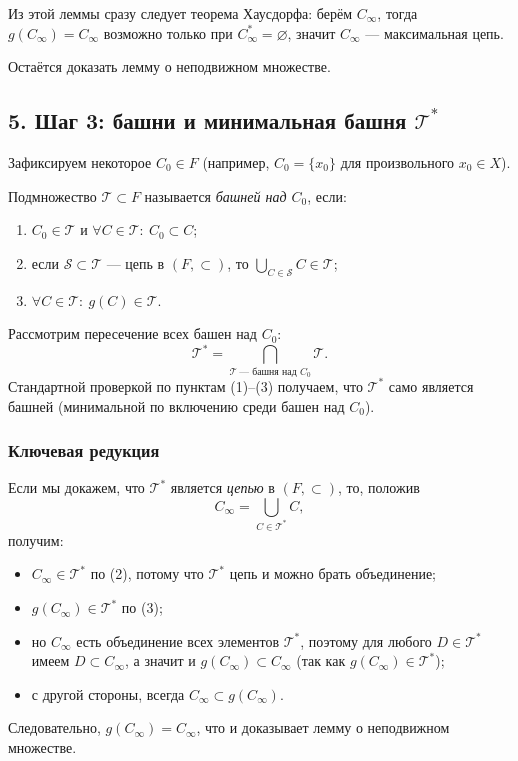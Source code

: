 \noindent
Из этой леммы сразу следует теорема Хаусдорфа: берём $C_{\infty}$, тогда $g(C_{\infty})=C_{\infty}$
возможно только при $C_{\infty}^{*}=\varnothing$, значит $C_{\infty}$ --- максимальная цепь.

Остаётся доказать лемму о неподвижном множестве.

\subsection*{5. Шаг 3: башни и минимальная башня $\mathcal T^{*}$}

Зафиксируем некоторое $C_0\in F$ (например, $C_0=\{x_0\}$ для произвольного $x_0\in X$).

\begin{definition}
    Подмножество $\mathcal T\subset F$ называется \emph{башней над $C_0$}, если:
    \begin{enumerate}
        \item $C_0\in\mathcal T$ и $\forall C\in\mathcal T:\ C_0\subset C$;
        \item если $\mathcal S\subset\mathcal T$ --- цепь в $(F,\subset)$, то $\displaystyle \bigcup_{C\in\mathcal S} C\in\mathcal T$;
        \item $\forall C\in\mathcal T:\ g(C)\in\mathcal T$.
    \end{enumerate}
\end{definition}

Рассмотрим пересечение всех башен над $C_0$:
\[
    \mathcal T^{*}=\bigcap_{\mathcal T\ \text{--- башня над }C_0}\mathcal T.
\]
Стандартной проверкой по пунктам (1)--(3) получаем, что $\mathcal T^{*}$ само является башней
(минимальной по включению среди башен над $C_0$).

\subsubsection*{Ключевая редукция}
Если мы докажем, что $\mathcal T^{*}$ является \emph{цепью} в $(F,\subset)$, то, положив
\[
    C_{\infty}=\bigcup_{C\in\mathcal T^{*}} C,
\]
получим:
\begin{itemize}
    \item $C_{\infty}\in\mathcal T^{*}$ по (2), потому что $\mathcal T^{*}$ цепь и можно брать объединение;
    \item $g(C_{\infty})\in\mathcal T^{*}$ по (3);
    \item но $C_{\infty}$ есть объединение всех элементов $\mathcal T^{*}$, поэтому для любого $D\in\mathcal T^{*}$
    имеем $D\subset C_{\infty}$, а значит и $g(C_{\infty})\subset C_{\infty}$ (так как $g(C_{\infty})\in\mathcal T^{*}$);
    \item с другой стороны, всегда $C_{\infty}\subset g(C_{\infty})$.
\end{itemize}
Следовательно, $g(C_{\infty})=C_{\infty}$, что и доказывает лемму о неподвижном множестве.

